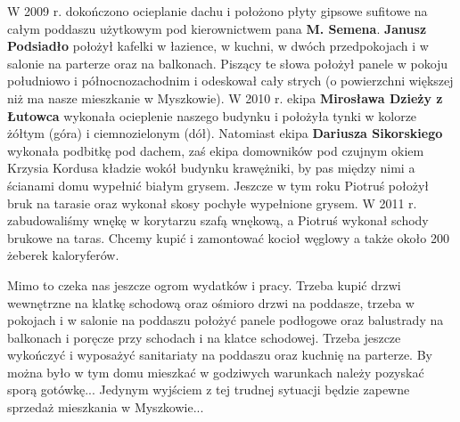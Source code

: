 W 2009 r. dokończono ocieplanie dachu  i położono płyty gipsowe sufitowe na całym poddaszu użytkowym pod kierownictwem pana \textbf{M. Semena}. \textbf{Janusz Podsiadło} położył kafelki w łazience, w kuchni, w dwóch przedpokojach i w salonie na parterze oraz na balkonach. Piszący te słowa  położył panele w pokoju południowo i północnozachodnim i odeskował cały strych (o powierzchni większej niż ma nasze mieszkanie w Myszkowie). W 2010 r. ekipa \textbf{Mirosława Dzieży z Łutowca} wykonała ocieplenie naszego budynku i położyła tynki w kolorze żółtym (góra) i ciemnozielonym (dół). Natomiast ekipa \textbf{Dariusza Sikorskiego} wykonała podbitkę pod dachem, zaś ekipa domowników pod czujnym okiem Krzysia Kordusa kładzie wokół budynku krawężniki, by pas między nimi a ścianami domu wypełnić białym grysem. Jeszcze w tym roku Piotruś położył bruk na tarasie oraz wykonał skosy pochyłe wypełnione grysem. W 2011 r. zabudowaliśmy wnękę w korytarzu szafą wnękową, a Piotruś wykonał schody brukowe na taras. Chcemy kupić i zamontować kocioł węglowy a także około 200 żeberek kaloryferów.

Mimo to czeka nas jeszcze ogrom wydatków i pracy. Trzeba kupić drzwi wewnętrzne na klatkę schodową oraz ośmioro drzwi na poddasze, trzeba w pokojach i w salonie na poddaszu położyć panele podłogowe oraz balustrady na balkonach i poręcze przy schodach i na klatce schodowej. Trzeba jeszcze wykończyć i wyposażyć sanitariaty na poddaszu oraz kuchnię na parterze. By można było w tym domu mieszkać w godziwych warunkach należy pozyskać sporą gotówkę... Jedynym wyjściem z tej trudnej sytuacji będzie zapewne sprzedaż mieszkania w Myszkowie...

